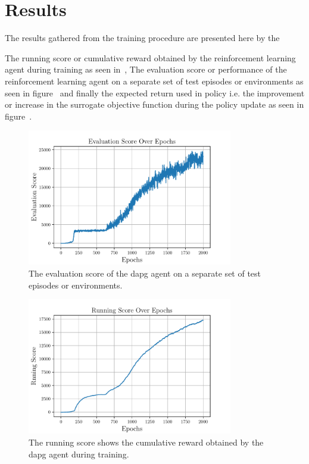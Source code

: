 \section{Results}\label{3-in-hand-manipulation-results}
The results gathered from the training procedure are presented here by the 

The running score or cumulative reward obtained by the reinforcement learning agent during training as seen in~, The evaluation score or performance of the reinforcement learning agent on a separate set of test episodes or environments as seen in figure~ and finally the expected return used in policy i.e. the improvement or increase in the surrogate objective function during the policy update as seen in figure~.

\begin{figure}[!h]
	\begin{center}
		\includegraphics[width=0.8\textwidth]{chapters/3-in-hand-manipulation/fig/evaluation-score-over-epochs.pdf}
	\end{center}
	\caption{The evaluation score of the \gls{dapg} agent on a separate set of test episodes or environments.}
	\label{fig:evaluation-score-over-epochs}
\end{figure}

\begin{figure}[!h]
	\begin{center}
		\includegraphics[width=0.8\textwidth]{chapters/3-in-hand-manipulation/fig/running-score-over-epochs.pdf}
	\end{center}
	\caption{The running score shows the cumulative reward obtained by the \gls{dapg} agent during training.}
	\label{fig:running-score-over-epochs}
\end{figure}

